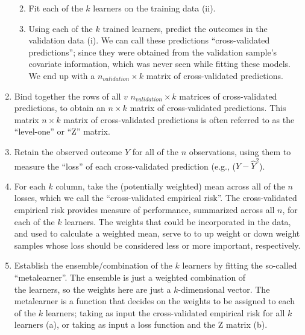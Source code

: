 \documentclass[12pt, krantz2,]{book}
\providecommand{\tightlist}{%
  \setlength{\itemsep}{0pt}\setlength{\parskip}{0pt}}
\theoremstyle{definition}
\theoremstyle{definition}
\theoremstyle{definition}
\newcommand{\1}{\mathbbm{1}}
\begin{document}
\begin{enumerate}
  \begin{enumerate}
  \def\labelenumii{\alph{enumii}.}
  \setcounter{enumii}{1}
  \tightlist
  \item
    Fit each of the \(k\) learners on the training data (ii).
  \item
    Using each of the \(k\) trained learners, predict the outcomes in the
    validation data (i). We can call these predictions
    ``cross-validated predictions''; since they were obtained from the
    validation sample's covariate information, which was never seen while
    fitting these models. We end up with a \(n_{validation} \times k\)
    matrix of cross-validated predictions.
  \end{enumerate}
\item
  Bind together the rows of all \(v\) \(n_{validation} \times k\) matrices of
  cross-validated predictions, to obtain an \(n \times k\) matrix of
  cross-validated predictions. This matrix \(n \times k\) matrix of
  cross-validated predictions is often referred to as the
  ``level-one'' or ``Z'' matrix.
\item
  Retain the observed outcome \(Y\) for all of the \(n\) observations, using
  them to measure the ``loss'' of each cross-validated prediction
  (e.g., (\(Y − \hat{Y}^2\)).
\item
  For each \(k\) column, take the (potentially weighted) mean across all of the
  \(n\) losses, which we call the ``cross-validated empirical risk''. The
  cross-validated empirical risk provides measure of performance, summarized
  across all \(n\), for each of the \(k\) learners. The weights that could be
  incorporated in the data, and used to calculate a weighted mean, serve to
  to up weight or down weight samples whose loss should be considered less or
  more important, respectively.
\item
  Establish the ensemble/combination of the \(k\) learners by fitting the
  so-called ``metalearner''. The ensemble is just a weighted combination of\\
  the learners, so the weights here are just a \(k\)-dimensional vector. The
  metalearner is a function that decides on the weights to be assigned to
  each of the \(k\) learners; taking as input the cross-validated empirical risk
  for all \(k\) learners (a), or taking as input a loss function and the Z
  matrix (b).


\end{enumerate}
\end{document}

